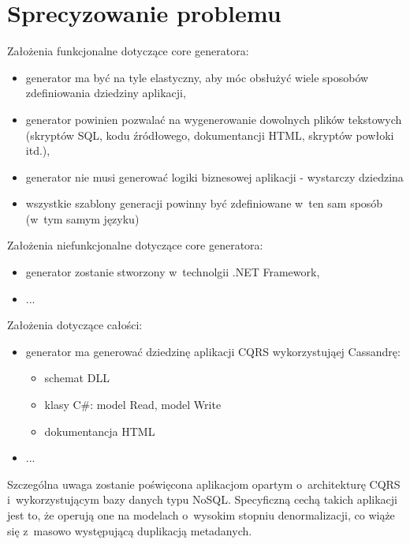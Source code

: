 \chapter{Sprecyzowanie problemu} \label{chap:the_problem}

Założenia funkcjonalne dotyczące core generatora:

\begin{itemize}
 \item generator ma być na tyle elastyczny, aby móc obsłużyć wiele sposobów zdefiniowania dziedziny aplikacji,
 \item generator powinien pozwalać na wygenerowanie dowolnych plików tekstowych (skryptów SQL, kodu źródłowego, dokumentancji HTML, skryptów powłoki itd.),
 \item generator nie musi generować logiki biznesowej aplikacji - wystarczy dziedzina
 \item wszystkie szablony generacji powinny być zdefiniowane w~ten sam sposób (w~tym samym języku)
\end{itemize}

Założenia niefunkcjonalne dotyczące core generatora:

\begin{itemize}
 \item generator zostanie stworzony w~technolgii .NET Framework,
 \item ...
\end{itemize}

Założenia dotyczące całości:

\begin{itemize}
 \item generator ma generować dziedzinę aplikacji CQRS wykorzystująej Cassandrę:
  \begin{itemize}
   \item schemat DLL
   \item klasy C\#: model Read, model Write
   \item dokumentancja HTML
  \end{itemize}
 \item ...
\end{itemize}

Szczególna uwaga zostanie poświęcona aplikacjom opartym o~architekturę CQRS i~wykorzystującym bazy danych typu NoSQL.
Specyficzną cechą takich aplikacji jest to, że operują one na modelach o~wysokim stopniu denormalizacji, co wiąże się z~masowo występującą duplikacją metadanych.
